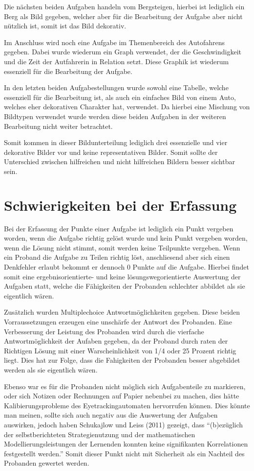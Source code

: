 Die nächsten beiden Aufgaben handeln vom Bergsteigen, hierbei ist lediglich ein Berg als Bild gegeben, welcher aber für die Bearbeitung der Aufgabe aber nicht nützlich ist, somit ist das Bild dekorativ. 


Im Anschluss wird noch eine Aufgabe im Themenbereich des Autofahrens gegeben. Dabei wurde wiederum ein Graph verwendet, der die Geschwindigkeit und die Zeit der Autfahrerin in Relation setzt. Diese Graphik ist wiederum essenziell für die Bearbeitung der Aufgabe. 


In den letzten beiden Aufgabestellungen wurde sowohl eine Tabelle, welche essenziell für die Bearbeitung ist, als auch ein einfaches Bild von einem Auto, welches eher dekorativen Charakter hat, verwendet. Da hierbei eine Mischung von Bildtypen verwendet wurde werden diese beiden Aufgaben in der weiteren Bearbeitung nicht weiter betrachtet. 

Somit kommen in dieser Bildunterteilung lediglich drei essenzielle und vier dekorative Bilder vor und keine representativen Bilder. Somit sollte der Unterschied zwischen hilfreichen und nicht hilfreichen Bildern besser sichtbar sein.

\section{Schwierigkeiten bei der Erfassung}

Bei der Erfassung der Punkte einer Aufgabe ist lediglich ein Punkt vergeben worden, wenn die Aufgabe richtig gelöst wurde und kein Punkt vergeben worden, wenn die Lösung nicht stimmt, somit werden keine Teilpunkte vergeben. Wenn ein Proband die Aufgabe zu Teilen richtig löst, anschliesend aber sich einen Denkfehler erlaubt bekommt er dennoch 0 Punkte auf die Aufgabe. Hierbei findet somit eine ergebnisorientierte- und keine lösungswegorientierte Auswertung der Aufgaben statt, welche die Fähigkeiten der Probanden schlechter abbildet als sie eigentlich wären.

Zusätzlich wurden Multiplechoice Antwortmöglichkeiten gegeben. Diese beiden Vorraussetzungen erzeugen eine unschärfe der Antwort des Probanden. Eine Verbesserung der Leistung des Probanden wird durch die vierfache Antwortmöglichkeit der Aufaben gegeben, da der Proband durch raten der Richtigen Lösung mit einer Warscheinlichkeit von 1/4 oder 25 Prozent richtig liegt. Dies hat zur Folge, dass die Fahigkeiten der Probanden besser abgebildet werden als sie eigentlich wären.  

Ebenso war es für die Probanden nicht möglich sich Aufgabenteile zu markieren, oder sich Notizen oder Rechnungen auf Papier nebenbei zu machen, dies hätte Kalibierungsprobleme des Eyetrackingautomaten hervorrufen können. Dies könnte man meinen, sollte sich auch negativ aus die Auswertung der Aufgaben auswirken, jedoch haben Schukajlow und Leiss (2011) gezeigt, dass ``(b)ezüglich der selbstberichteten Strategienutzung und der mathematischen Modellierungsleistungen der Lernenden konnten keine signifikanten Korrelationen festgestellt werden.'' Somit dieser Punkt nicht mit Sicherheit als ein Nachteil des Probanden gewertet werden. 

